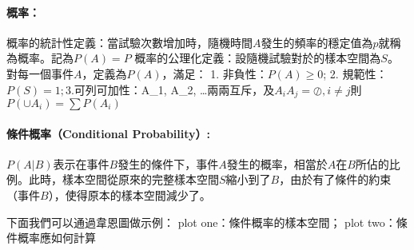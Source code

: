 \documentclass[11pt]{article}
\begin{document}
    \hypertarget{ux6982ux7387}{%
\paragraph{概率：}\label{ux6982ux7387}}

概率的統計性定義：當試驗次數增加時，隨機時間\(A\)發生的頻率的穩定值為\(p\)就稱為概率。記為\(P(A) = P\)
概率的公理化定義：設隨機試驗對於的樣本空間為\(S\)。對每一個事件\(A\)，定義為\(P(A)\)，滿足：
1. 非負性：\(P(A) \geq 0\); 2.
規範性：\(P(S) = 1; 3. 可列可加性：\)A\_1, A\_2,
\dots 兩兩互斥，及\(A_iA_j = \oslash, i \neq j\)則
\(P(\cup A_i) = \sum P(A_i)\)

    \hypertarget{ux689dux4ef6ux6982ux7387conditional-probability}{%
\paragraph{條件概率（Conditional
Probability）:}\label{ux689dux4ef6ux6982ux7387conditional-probability}}

\(P(A|B)\)表示在事件\(B\)發生的條件下，事件\(A\)發生的概率，相當於\(A\)在\(B\)所佔的比例。此時，樣本空間從原來的完整樣本空間\(S\)縮小到了\(B\)，由於有了條件的約束（事件\(B\)），使得原本的樣本空間減少了。

    下面我們可以通過韋恩圖做示例： plot one：條件概率的樣本空間； plot
two：條件概率應如何計算
\end{document}
